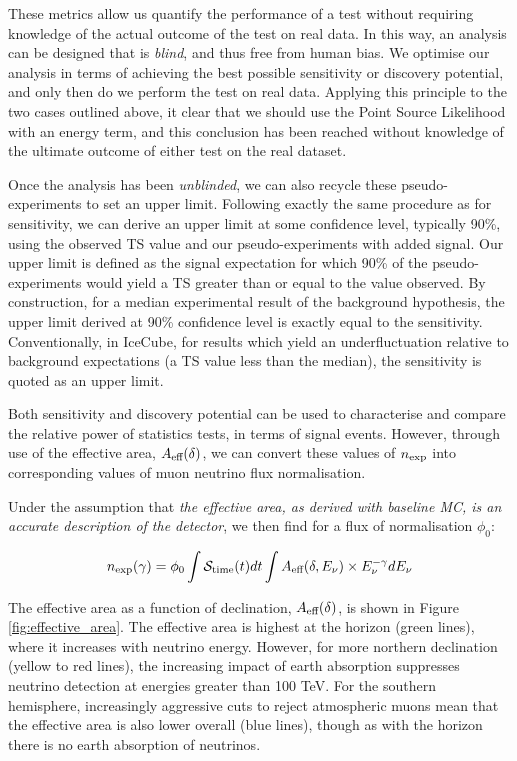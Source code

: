 These metrics allow us quantify the performance of a test without requiring knowledge of the actual outcome of the test on real data. In this way, an analysis can be designed that is \emph{blind}, and thus free from human bias. We optimise our analysis in terms of achieving the best possible sensitivity or discovery potential, and only then do we perform the test on real data. Applying this principle to the two cases outlined above, it clear that we should use the Point Source Likelihood with an energy term, and this conclusion has been reached without knowledge of the ultimate outcome of either test on the real dataset. 

Once the analysis has been \emph{unblinded}, we can also recycle these pseudo-experiments to set an upper limit. Following exactly the same procedure as for sensitivity, we can derive an upper limit at some confidence level, typically 90\%, using the observed TS value and our pseudo-experiments with added signal. Our upper limit is defined as the signal expectation for which 90\% of the pseudo-experiments would yield a TS greater than or equal to the value observed. By construction, for a median experimental result of the background hypothesis, the upper limit derived at 90\% confidence level is exactly equal to the sensitivity. Conventionally, in IceCube, for results which yield an underfluctuation relative to background expectations (a TS value less than the median), the sensitivity is quoted as an upper limit.

Both sensitivity and discovery potential can be used to characterise and compare the relative power of statistics tests, in terms of signal events. However, through use of the effective area,  $A_{\textup{eff}} (\delta)$, we can convert these values of $n_{\textup{exp}}$ into corresponding values of muon neutrino flux normalisation.

Under the assumption that \emph{the effective area, as derived with baseline MC, is an accurate description of the detector},  we then find for a flux of normalisation $\phi_{0}$:

\begin{equation}
n_{\textup{exp}} (\gamma) = \phi_{0} \int \mathcal{S}_{\textup{time}}(t) dt \int A_{\textup{eff}}(\delta, E_{\nu}) \times E_{\nu}^{-\gamma} dE_{\nu}
\label{eq:n_exp}
\end{equation}

The effective area as a function of declination, $A_{\textup{eff}} (\delta)$, is shown in Figure \ref{fig:effective_area}. The effective area is highest at the horizon (green lines), where it increases with neutrino energy. However, for more northern declination (yellow to red lines), the increasing impact of earth absorption suppresses neutrino detection at energies greater than 100 TeV. For the southern hemisphere, increasingly aggressive cuts to reject atmospheric muons mean that the effective area is also lower overall (blue lines), though as with the horizon there is no earth absorption of neutrinos.

